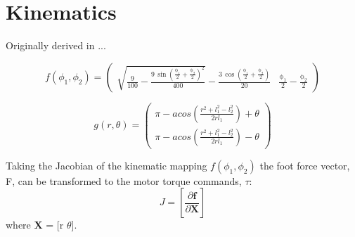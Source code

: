 \chapter{Kinematics}

Originally derived in \cite{Duperret}...

\begin{equation}
f(\phi_1, \phi_2) = \left(\begin{array}{cc} \sqrt{\frac{9}{100} - \frac{9\, {\sin\!\left(\frac{\mathrm{\phi_1}}{2} + \frac{\mathrm{\phi_2}}{2}\right)}^2}{400}} - \frac{3\, \cos\!\left(\frac{\mathrm{\phi_1}}{2} + \frac{\mathrm{\phi_2}}{2}\right)}{20} & \frac{\mathrm{\phi_1}}{2} - \frac{\mathrm{\phi_2}}{2} \end{array}\right)
\end{equation}

\begin{equation}
g(r, \theta) = \left(\begin{array}{c} \pi - acos(\frac{r^2 + l_1^2 - l_2^2}{2rl_1}) + \theta \\
\pi - acos(\frac{r^2 + l_1^2 - l_2^2}{2rl_1}) - \theta  \end{array}\right)
\end{equation}


Taking the Jacobian of the kinematic mapping $f(\phi_1, \phi_2)$ the foot force vector, F, can be transformed to the motor torque commands, $\tau$:
\begin{equation}
J = \left[ \frac{\partial \textbf{f}}{\partial \textbf{X}} \right] 
\end{equation}
where \textbf{X} = [r $\theta$].

